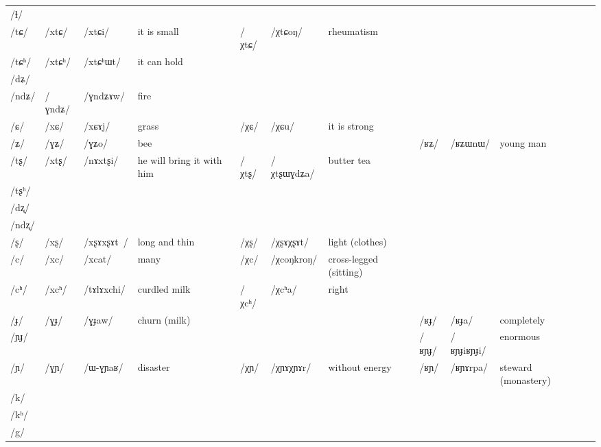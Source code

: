 \documentclass[oldfontcommands,oneside,a4paper,11pt]{article}
\newcommand{\ipa}[1]{\mbox{/#1/}} %
\newcommand{\deux}[1]{/#1/}
\newcommand{\tib}[1]{\cellcolor{lightgray}\textbf{#1}}
\newcommand{\idph}[1]{\cellcolor{gray}\textbf{#1}}
\begin{document}
\begin{landscape}
\begin{longtable}{l|lll|lll|lll|l}
\ipa{ɬ} 	& 	  	& 	  	& 	  	& 	  	& 	  	& 	& 	  	& 	  	& 	 \\  
\ipa{tɕ}	& 	 \deux{xtɕ}	& 	 \ipa{xtɕi}	& 	 it is small 	& 	 \deux{χtɕ}  \tib{} 	& 	 \ipa{χtɕoŋ}	& 	rheumatism	&	&	& \\  	
\ipa{tɕʰ}	& 	 \deux{xtɕʰ}	& 	 \ipa{xtɕʰɯt}	& 	it can hold	& 	  	& 	  	& 	&	&	& \\  		
\ipa{dʑ} 	& 	  	& 	  	& 	  	& 	  	& 	  	& 	& 	  	& 	  	& 	 \\  
\ipa{ndʑ}	& 	 \deux{ɣndʑ}	& 	 \ipa{ɣndʑɤw}	& 	fire	& 	  	& 	  	& 	&	&	&	 \\  	
\ipa{ɕ}	& 	 \deux{xɕ}	& 	 \ipa{xɕɤj}	& 	grass	& 	 \deux{χɕ}	& 	 \ipa{χɕu}	& 	it is strong 	&	&	&\\  	
\ipa{ʑ}	& 	 \deux{ɣʑ}	& 	 \ipa{ɣʑo}	& 	bee	& 	&	&	& \ipa{ʁʑ}	&	 \ipa{ʁʑɯnɯ}	& 	young man \\  		
\ipa{tʂ}	& 	 \deux{xtʂ}	& 	 \ipa{nɤxtʂi}	& 	 he will bring it with him 	& 	 \deux{χtʂ}  \tib{}	& 	 \ipa{χtʂɯɣdʑa}	& 	butter tea 	&	&	&\\  	
\ipa{tʂʰ}	& 	  	& 	  	& 	  	& 	  	& 	  	& 	&	&	&	 \\  	
\ipa{dʐ}	& 	  	& 	  	& 	  	& 	  	& 	  	& 	&	&	&	 \\  	
\ipa{ndʐ}	& 	  	& 	  	& 	  	& 	  	& 	  	& 	&	&	&	 \\  	
\ipa{ʂ}	& 	 \deux{xʂ} \idph{}	& 	 \ipa{xʂɤxʂɤt }	& 	long and thin	& 	 \deux{χʂ} \idph{}	& 	 \ipa{χʂɤχʂɤt}	& 	light (clothes)	&	&	& \\  	
\ipa{c}	& 	 \deux{xc}	& 	 \ipa{xcat}	& 	many	& 	 \deux{χc} \tib{}	& 	 \ipa{χcoŋkroŋ}	& 	 cross-legged (sitting) 	&	&	&\\  	
\ipa{cʰ}	& 	 \deux{xcʰ}	& 	 \ipa{tɤlɤxchi}	& 	curdled milk	& 	 \deux{χcʰ}	& 	 \ipa{χcʰa}	& 	 right 	&	&	&\\  	
\ipa{ɟ}	& 	 \deux{ɣɟ}	& 	 \ipa{ɣɟaw}	& 	 churn (milk) 	& 	&	&	&	 \deux{ʁɟ}	& 	  \ipa{ʁɟa}	& 	completely  \\  	
\ipa{ɲɟ}	&  	& 	 	& 	 	& 	&	&	&	 \deux{ʁɲɟ}	& 	  \ipa{ʁɲɟiʁɲɟi}	& 	enormous  \\  	
\ipa{ɲ}	& 	 \deux{ɣɲ}	& 	 \ipa{ɯ-ɣɲaʁ}	& 	 disaster 	& 	\deux{χɲ} \idph{}	& \ipa{χɲɤχɲɤr}	& without energy 	& \deux{ʁɲ}\tib{}	& 	 \ipa{ʁɲɤrpa}	& 	steward (monastery) \\  	
\ipa{k}	& 	  	& 	  	& 	  	& 	  	& 	  	& 	& 	  	& 	  	& 	 \\  
\ipa{kʰ}	& 	  	& 	  	& 	  	& 	  	& 	  	& 	& 	  	& 	  	& 	 \\  
\ipa{g} 	& 	  	& 	  	& 	  	& 	  	& 	  	& 	& 	  	& 	  	& 	 \\  

\end{longtable}
\end{landscape}
\end{document}
